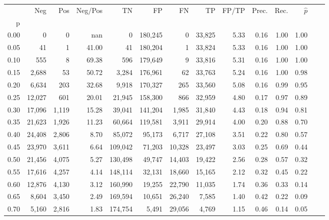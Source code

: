 \begin{tabular}{rrrrrrrrrrrrrr}
\toprule
{} &     Neg &    Pos & Neg/Pos &       TN &       FP &      FN &      TP & FP/TP & Prec. &  Rec. & $\hat{p}$ \\
p    &         &        &         &          &          &         &         &       &       &       &           \\
\midrule
0.00 &       0 &      0 &     nan &        0 &  180,245 &       0 &  33,825 &  5.33 &  0.16 &  1.00 &      1.00 \\
0.05 &      41 &      1 &   41.00 &       41 &  180,204 &       1 &  33,824 &  5.33 &  0.16 &  1.00 &      1.00 \\
0.10 &     555 &      8 &   69.38 &      596 &  179,649 &       9 &  33,816 &  5.31 &  0.16 &  1.00 &      1.00 \\
0.15 &   2,688 &     53 &   50.72 &    3,284 &  176,961 &      62 &  33,763 &  5.24 &  0.16 &  1.00 &      0.98 \\
0.20 &   6,634 &    203 &   32.68 &    9,918 &  170,327 &     265 &  33,560 &  5.08 &  0.16 &  0.99 &      0.95 \\
0.25 &  12,027 &    601 &   20.01 &   21,945 &  158,300 &     866 &  32,959 &  4.80 &  0.17 &  0.97 &      0.89 \\
0.30 &  17,096 &  1,119 &   15.28 &   39,041 &  141,204 &   1,985 &  31,840 &  4.43 &  0.18 &  0.94 &      0.81 \\
0.35 &  21,623 &  1,926 &   11.23 &   60,664 &  119,581 &   3,911 &  29,914 &  4.00 &  0.20 &  0.88 &      0.70 \\
0.40 &  24,408 &  2,806 &    8.70 &   85,072 &   95,173 &   6,717 &  27,108 &  3.51 &  0.22 &  0.80 &      0.57 \\
0.45 &  23,970 &  3,611 &    6.64 &  109,042 &   71,203 &  10,328 &  23,497 &  3.03 &  0.25 &  0.69 &      0.44 \\
0.50 &  21,456 &  4,075 &    5.27 &  130,498 &   49,747 &  14,403 &  19,422 &  2.56 &  0.28 &  0.57 &      0.32 \\
0.55 &  17,616 &  4,257 &    4.14 &  148,114 &   32,131 &  18,660 &  15,165 &  2.12 &  0.32 &  0.45 &      0.22 \\
0.60 &  12,876 &  4,130 &    3.12 &  160,990 &   19,255 &  22,790 &  11,035 &  1.74 &  0.36 &  0.33 &      0.14 \\
0.65 &   8,604 &  3,450 &    2.49 &  169,594 &   10,651 &  26,240 &   7,585 &  1.40 &  0.42 &  0.22 &      0.09 \\
0.70 &   5,160 &  2,816 &    1.83 &  174,754 &    5,491 &  29,056 &   4,769 &  1.15 &  0.46 &  0.14 &      0.05 \\

\end{tabular}
